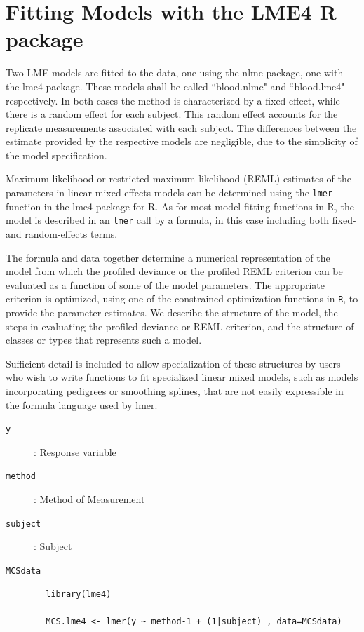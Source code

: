 \documentclass[12pt, a4paper]{report}
\theoremstyle{plain}
\theoremstyle{definition}
\theoremstyle{remark}
\begin{document}
	
	\section{Fitting Models with the LME4 R package}
	Two LME models are fitted to the data, one using the nlme package, one with the lme4 package. These models shall be called ``blood.nlme" and ``blood.lme4" respectively.
	In both cases the method is characterized by a fixed effect, while there is a random effect for each subject.
	This random effect accounts for the replicate measurements associated with each subject.
	The differences between the estimate provided by the respective models are negligible, due to the simplicity of the model specification.
	
	
	Maximum likelihood or restricted maximum likelihood (REML) estimates of the parameters in linear mixed-effects models can be determined using the \texttt{lmer} function in the lme4 package for R. As for most model-fitting functions in R, the model is described in an \texttt{lmer} call by a formula, in this case including both fixed- and random-effects terms. 
	
	The formula and data together determine a numerical representation of the model from which the profiled deviance or the profiled REML criterion can be evaluated as a function of some of the model parameters. The appropriate criterion is optimized, using one of the constrained optimization functions in \texttt{R}, to provide the parameter estimates. We describe the structure of the model, the steps in evaluating the profiled deviance or REML criterion, and the structure of classes or types that represents such a model. 
	
	Sufficient detail is included to allow specialization of these structures by users who wish to write functions to fit specialized linear mixed models, such as models incorporating pedigrees or smoothing splines, that are not easily expressible in the formula language used by lmer.
	
	
	\begin{description}
		\item[\texttt{y}] : Response variable
		\item[\texttt{method}] : Method of Measurement
		\item[\texttt{subject}] : Subject
		\item[\texttt{MCSdata}] 
	\end{description}
	\begin{framed}
		\begin{verbatim}
		library(lme4)
		
		MCS.lme4 <- lmer(y ~ method-1 + (1|subject) , data=MCSdata)
		\end{verbatim}
	\end{framed}
	\newpage
	
\end{document}
